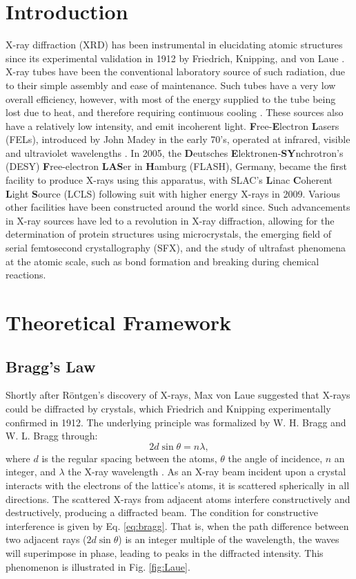 \documentclass[aps,prb,twocolumn,superscriptaddress]{revtex4-2}
\begin{document}
\section{Introduction} \label{sec:intro}
X-ray diffraction (XRD) has been instrumental in elucidating atomic structures
since its experimental validation in 1912 by Friedrich, Knipping, and von Laue
\cite{vonLaue1912}. X-ray tubes have been the conventional laboratory source of
such radiation, due to their simple assembly and ease of maintenance. Such tubes
have a very low overall efficiency, however, with most of the energy supplied
to the tube being lost due to heat, and therefore requiring continuous cooling
\cite{pecharsky2005fundamentals}. These sources also have a relatively low
intensity, and emit incoherent light.  \textbf{F}ree-\textbf{E}lectron 
\textbf{L}asers (FELs), introduced by John Madey in the early 70's, operated 
at infrared, visible and ultraviolet wavelengths \cite{OGUndulator}. In 2005,
the \textbf{D}eutsches \textbf{E}lektronen-\textbf{SY}nchrotron's (DESY)
\textbf{F}ree-electron \textbf{LAS}er in \textbf{H}amburg (FLASH), Germany,
became the first facility to produce X-rays using this apparatus, with SLAC's 
\textbf{L}inac \textbf{C}oherent \textbf{L}ight \textbf{S}ource (LCLS) 
following suit with higher energy X-rays in 2009. Various other facilities have 
been constructed around the world since. Such advancements in X-ray 
sources have led to a revolution in X-ray diffraction, allowing for the
determination of protein structures using microcrystals, the emerging field of 
serial femtosecond crystallography (SFX), and the study of ultrafast phenomena
at the atomic scale, such as bond formation and breaking during chemical reactions.


\section{Theoretical Framework} \label{sec:theory}
\subsection{Bragg's Law}
Shortly after Röntgen's discovery of X-rays, Max von Laue suggested that X-rays
could be diffracted by crystals, which Friedrich and Knipping experimentally
confirmed in 1912. The underlying principle was formalized by W. H. Bragg and W.
L. Bragg through:
\begin{equation}\label{eq:bragg}
  2d\sin\theta = n\lambda,
\end{equation}
where $d$ is the regular spacing between the atoms, $\theta$ the angle of
incidence, $n$ an integer, and $\lambda$ the X-ray wavelength \cite{Bragg1913}.
As an X-ray beam incident upon a crystal interacts with the electrons of the
lattice's atoms, it is scattered spherically in all directions. The scattered
X-rays from adjacent atoms interfere constructively and destructively, producing
a diffracted beam. The condition for constructive interference is given by Eq.
\ref{eq:bragg}. That is, when the path difference between two adjacent rays
($2d\sin\theta$) is an integer multiple of the wavelength, the waves will
superimpose in phase, leading to peaks in the diffracted intensity. This
phenomenon is illustrated in Fig. \ref{fig:Laue}.
\end{document}
